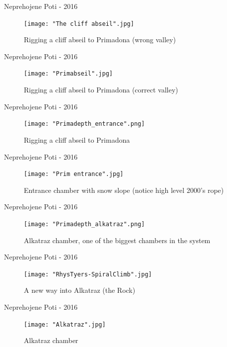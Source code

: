 \documentclass[10pt]{beamer}
\begin{document}
\begin{frame}{Neprehojene Poti - 2016}
    \begin{figure}[!ht]
    \centering
    \texttt{[image: "The cliff abseil".jpg]}
    \caption{Rigging a cliff abseil to Primadona (wrong valley)}
    \end{figure}
\end{frame} 

\begin{frame}{Neprehojene Poti - 2016}
    \begin{figure}[!ht]
    \centering
    \texttt{[image: "Primabseil".jpg]}
    \caption{Rigging a cliff abseil to Primadona (correct valley)}
    \end{figure}
\end{frame} 

\begin{frame}{Neprehojene Poti - 2016}
    \begin{figure}[!ht]
    \centering
    \texttt{[image: "Primadepth\_entrance".png]}
    \caption{Rigging a cliff abseil to Primadona}
    \end{figure}
\end{frame} 

\begin{frame}{Neprehojene Poti - 2016}
    \begin{figure}[!ht]
    \centering
    \texttt{[image: "Prim entrance".jpg]}
    \caption{Entrance chamber with snow slope (notice high level 2000's rope)}
    \end{figure}
\end{frame} 

\begin{frame}{Neprehojene Poti - 2016}
    \begin{figure}[!ht]
    \centering
    \texttt{[image: "Primadepth\_alkatraz".png]}
    \caption{Alkatraz chamber, one of the biggest chambers in the system}
    \end{figure}
\end{frame} 

\begin{frame}{Neprehojene Poti - 2016}
    \begin{figure}[!ht]
    \centering
    \texttt{[image: "RhysTyers-SpiralClimb".jpg]}
    \caption{A new way into Alkatraz (the Rock)}
    \end{figure}
\end{frame} 

\begin{frame}{Neprehojene Poti - 2016}
    \begin{figure}[!ht]
    \centering
    \texttt{[image: "Alkatraz".jpg]}
    \caption{Alkatraz chamber}
    \end{figure}
\end{frame} 
\end{document}
